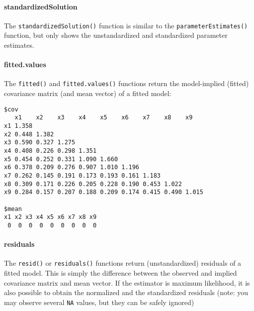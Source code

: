 \hypertarget{standardizedsolution}{%
\paragraph{standardizedSolution}\label{standardizedsolution}}

The \texttt{standardizedSolution()} function is similar to the
\texttt{parameterEstimates()} function, but only shows the
unstandardized and standardized parameter estimates.

\hypertarget{fitted.values}{%
\paragraph{fitted.values}\label{fitted.values}}

The \texttt{fitted()} and \texttt{fitted.values()} functions return the
model-implied (fitted) covariance matrix (and mean vector) of a fitted
model:

\begin{Shaded}
\begin{Highlighting}[]
\StringTok{ }
\end{Highlighting}
\end{Shaded}

\begin{verbatim}
$cov
   x1    x2    x3    x4    x5    x6    x7    x8    x9   
x1 1.358                                                
x2 0.448 1.382                                          
x3 0.590 0.327 1.275                                    
x4 0.408 0.226 0.298 1.351                              
x5 0.454 0.252 0.331 1.090 1.660                        
x6 0.378 0.209 0.276 0.907 1.010 1.196                  
x7 0.262 0.145 0.191 0.173 0.193 0.161 1.183            
x8 0.309 0.171 0.226 0.205 0.228 0.190 0.453 1.022      
x9 0.284 0.157 0.207 0.188 0.209 0.174 0.415 0.490 1.015

$mean
x1 x2 x3 x4 x5 x6 x7 x8 x9 
 0  0  0  0  0  0  0  0  0 
\end{verbatim}

\hypertarget{residuals}{%
\paragraph{residuals}\label{residuals}}

The \texttt{resid()} or \texttt{residuals()} functions return
(unstandardized) residuals of a fitted model. This is simply the
difference between the observed and implied covariance matrix and mean
vector. If the estimator is maximum likelihood, it is also possible to
obtain the normalized and the standardized residuals (note: you may
observe several \texttt{NA} values, but they can be safely ignored)

